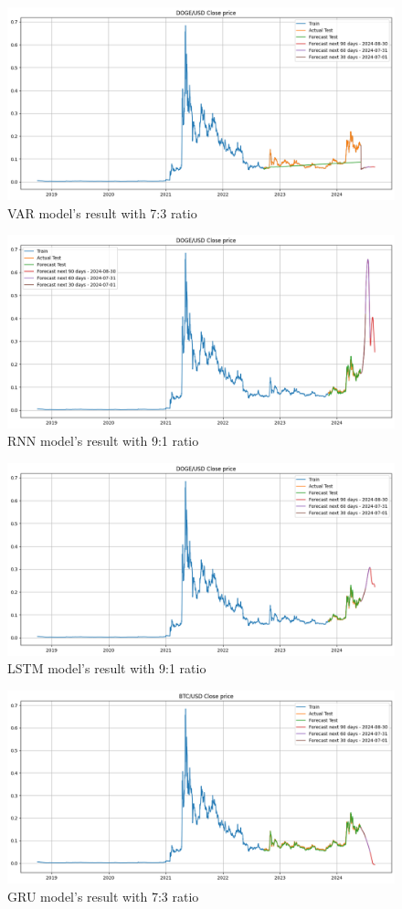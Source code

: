 \documentclass{ieeeojies}
\begin{document}
\begin{figure}[H]
    \centering
    \includegraphics[width=0.8\linewidth]{./././visualize/VAR/DOGE-70-30.png}
    \caption{VAR model’s result with 7:3 ratio}
    \label{fig:31}
\end{figure}
\begin{figure}[H]
    \centering
    \includegraphics[width=0.8\linewidth]{./././visualize/RNN/DOGE-90-10.png}
    \caption{RNN model’s result with 9:1 ratio}
    \label{fig:32}
\end{figure}
\begin{figure}[H]
    \centering
    \includegraphics[width=0.8\linewidth]{./././visualize/LSTM/DOGE-90-10.png}
    \caption{LSTM model’s result with 9:1 ratio}
    \label{fig:33}
\end{figure}
\begin{figure}[H]
    \centering
    \includegraphics[width=0.8\linewidth]{./././visualize/GRU/DOGE-70-30.png}
    \caption{GRU model’s result with 7:3 ratio}
    \label{fig:34}
\end{figure}
\end{document}
